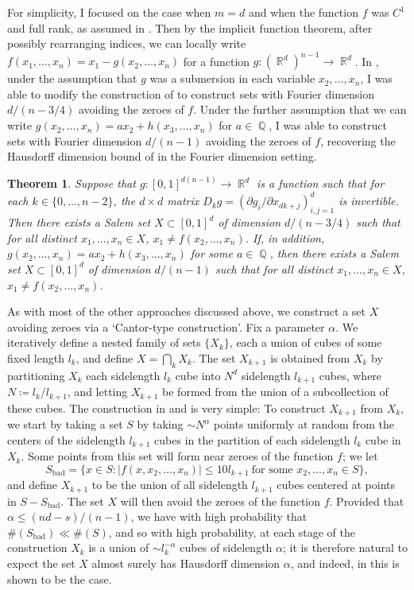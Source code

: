 \documentclass[11pt]{article}
\newtheorem*{theorem}{Theorem}
\DeclareMathOperator{\QQ}{\mathbb{Q}}
\DeclareMathOperator{\RR}{\mathbb{R}}
\begin{document}
For simplicity, I focused on the case when $m = d$ and when the function $f$ was $C^1$ and full rank, as assumed in \cite{FraserPramanik}. Then by the implicit function theorem, after possibly rearranging indices, we can locally write $f(x_1,\dots,x_n) = x_1 - g(x_2,\dots,x_n)$ for a function $g: (\RR^d)^{n-1} \to \RR^d$. In \cite{DensonFourier}, under the assumption that $g$ was a submersion in each variable $x_2,\dots,x_n$, I was able to modify the construction of \cite{FraserPramanik} to construct sets with Fourier dimension $d/(n-3/4)$ avoiding the zeroes of $f$. Under the further assumption that we can write $g(x_2,\dots,x_n) = ax_2 + h(x_3,\dots,x_n)$ for $a \in \QQ$, I was able to construct sets with Fourier dimension $d/(n-1)$ avoiding the zeroes of $f$, recovering the Hausdorff dimension bound of \cite{FraserPramanik} in the Fourier dimension setting.

\begin{theorem}
	Suppose that $g: [0,1]^{d(n-1)} \to \RR^d$ is a function such that for each $k \in \{ 0, \dots, n-2 \}$, the $d \times d$ matrix $D_k g = ( \partial g_i / \partial x_{dk+j} )_{i,j = 1}^d$ is invertible. Then there exists a Salem set $X \subset [0,1]^d$ of dimension $d/(n-3/4)$ such that for all distinct $x_1,\dots,x_n \in X$, $x_1 \neq f(x_2,\dots,x_n)$. If, in addition, $g(x_2,\dots,x_n) = ax_2 + h(x_3,\dots,x_n)$ for some $a \in \QQ$, then there exists a Salem set $X \subset [0,1]^d$ of dimension $d/(n-1)$ such that for all distinct $x_1,\dots,x_n \in X$, $x_1 \neq f(x_2,\dots,x_n)$.
\end{theorem}

As with most of the other approaches discussed above, we construct a set $X$ avoiding zeroes via a `Cantor-type construction'. Fix a parameter $\alpha$. We iteratively define a nested family of sets $\{ X_k \}$, each a union of cubes of some fixed length $l_k$, and define $X = \bigcap_k X_k$. The set $X_{k+1}$ is obtained from $X_k$ by partitioning $X_k$ each sidelength $l_k$ cube into $N^d$ sidelength $l_{k+1}$ cubes, where $N \coloneqq l_k / l_{k+1}$, and letting $X_{k+1}$ be formed from the union of a subcollection of these cubes. The construction in \cite{DensonPramanikZahl} and \cite{DensonFourier} is very simple: To construct $X_{k+1}$ from $X_k$, we start by taking a set $S$ by taking $\sim N^\alpha$ points uniformly at random from the centers of the sidelength $l_{k+1}$ cubes in the partition of each sidelength $l_k$ cube in $X_k$. Some points from this set will form near zeroes of the function $f$; we let
%
\[ S_{\text{bad}} = \{ x \in S : |f(x,x_2,\dots,x_n)| \leq 10 l_{k+1}\ \text{for some $x_2,\dots,x_n \in S$} \}, \]
%
and define $X_{k+1}$ to be the union of all sidelength $l_{k+1}$ cubes centered at points in $S - S_{\text{bad}}$. The set $X$ will then avoid the zeroes of the function $f$. Provided that $\alpha \leq (nd - s)/(n-1)$, we have with high probability that $\#(S_{\text{bad}}) \ll \#(S)$, and so with high probability, at each stage of the construction $X_k$ is a union of $\sim l_k^{-\alpha}$ cubes of sidelength $\alpha$; it is therefore natural to expect the set $X$ almost surely has Hausdorff dimension $\alpha$, and indeed, in \cite{DensonPramanikZahl} this is shown to be the case.
\end{document}
